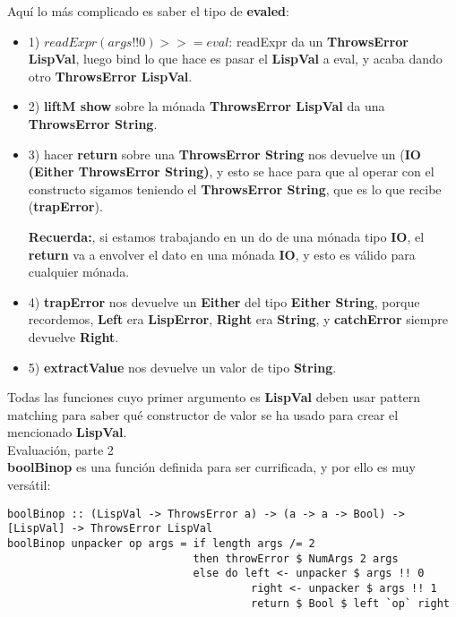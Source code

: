 Aqu\'i lo m\'as complicado es saber el tipo de \textbf{evaled}:

\begin{itemize}

\item 1) $readExpr (args !! 0) >>= eval$: readExpr da un \textbf{ThrowsError LispVal}, luego bind lo que hace es pasar el \textbf{LispVal} a eval, y acaba dando otro \textbf{ThrowsError LispVal}.

\item 2) \textbf{liftM show} sobre la m\'onada \textbf{ThrowsError LispVal} da una \textbf{ThrowsError String}.

\item 3) hacer \textbf{return} sobre una \textbf{ThrowsError String} nos devuelve un (\textbf{IO (Either ThrowsError String)}, y esto se hace para que al operar con el constructo \textbf{\<\-} sigamos teniendo el \textbf{ThrowsError String}, que es lo que recibe (\textbf{trapError}).

\textbf{Recuerda:}, si estamos trabajando en un do de una m\'onada tipo \textbf{IO}, el \textbf{return} va a envolver el dato en una m\'onada \textbf{IO}, y esto es v\'alido para cualquier m\'onada.

\item 4) \textbf{trapError} nos devuelve un \textbf{Either} del tipo \textbf{Either String}, porque recordemos, \textbf{Left} era \textbf{LispError}, \textbf{Right} era \textbf{String}, y \textbf{catchError} siempre devuelve \textbf{Right}.

\item 5) \textbf{extractValue} nos devuelve un valor de tipo \textbf{String}.
\end{itemize}

Todas las funciones cuyo primer argumento es \textbf{LispVal} deben usar pattern matching para saber qu\'e constructor de valor se ha usado para crear el mencionado \textbf{LispVal}.\\

Evaluaci\'on, parte 2\\

\textbf{boolBinop} es una funci\'on definida para ser currificada, y por ello es muy vers\'atil:\\

\begin{minipage}{\linewidth}
\begin{footnotesize}
\begin{lstlisting}[frame=single]
boolBinop :: (LispVal -> ThrowsError a) -> (a -> a -> Bool) -> [LispVal] -> ThrowsError LispVal
boolBinop unpacker op args = if length args /= 2 
                             then throwError $ NumArgs 2 args
                             else do left <- unpacker $ args !! 0
                                      right <- unpacker $ args !! 1
                                      return $ Bool $ left `op` right
\end{lstlisting}
\end{footnotesize}
\end{minipage}

